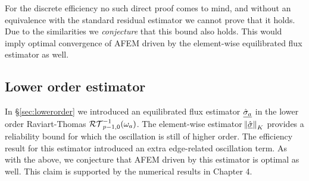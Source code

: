 \documentclass[thesis.tex]{subfiles}
\begin{document}
  For the discrete efficiency no such direct proof comes to mind, and without an equivalence  with the standard residual estimator 
  we cannot prove that it holds. Due to the similarities we \emph{conjecture} that this bound also holds. This would imply optimal convergence of AFEM
  driven by the element-wise equilibrated flux estimator as well.

  \subsection{Lower order estimator}
  In \S\ref{sec:lowerorder} we introduced an equilibrated flux estimator $\underline{\hat \sigma_a}$ in the lower order Raviart-Thomas $\mathcal{RT}_{p-1,0}^{-1}(\omega_a)$. 
  The element-wise estimator $\norm{\underline{\hat \sigma}}_K$ provides a reliability bound for which the oscillation is still of higher order. The
  efficiency result for this estimator introduced an extra edge-related oscillation term. As with the above, we conjecture that AFEM driven
  by this estimator is optimal as well. This claim is supported by the numerical results in Chapter 4.
\end{document}
